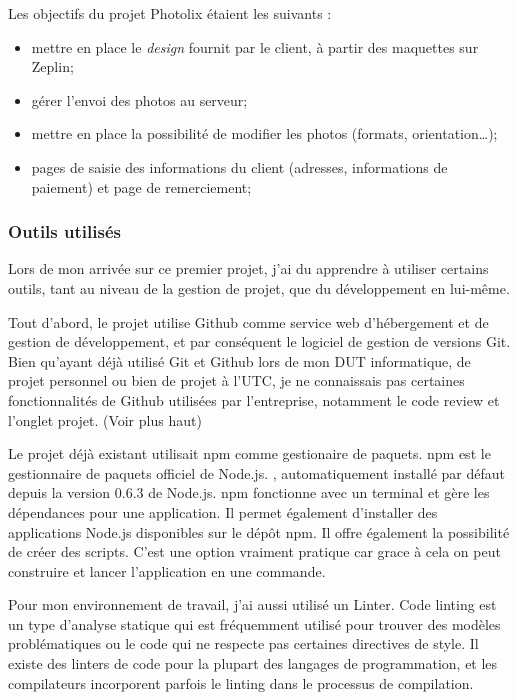 \bigskip

Les objectifs du projet Photolix étaient les suivants :

\begin{itemize}
\tightlist
\item
  mettre en place le \emph{design} fournit par le client, à partir des
  maquettes sur Zeplin;
\item
  gérer l'envoi des photos au serveur;
\item
  mettre en place la possibilité de modifier les photos (formats,
  orientation\ldots{});
\item
  pages de saisie des informations du client (adresses, informations de
  paiement) et page de remerciement;
\end{itemize}

\bigskip

\subsubsection{Outils utilisés}\label{outils-utilisuxe9s}

\bigskip

Lors de mon arrivée sur ce premier projet, j'ai du apprendre à utiliser
certains outils, tant au niveau de la gestion de projet, que du
développement en lui-même.

\bigskip

Tout d'abord, le projet utilise Github comme service web d'hébergement
et de gestion de développement, et par conséquent le logiciel de gestion
de versions Git. Bien qu'ayant déjà utilisé Git et Github lors de mon
DUT informatique, de projet personnel ou bien de projet à l'UTC, je ne
connaissais pas certaines fonctionnalités de Github utilisées par
l'entreprise, notamment le code review et l'onglet projet. (Voir plus
haut)

\bigskip

Le projet déjà existant utilisait npm comme gestionaire de paquets. npm
est le gestionnaire de paquets officiel de Node.js. , automatiquement
installé par défaut depuis la version 0.6.3 de Node.js. npm fonctionne
avec un terminal et gère les dépendances pour une application. Il permet
également d'installer des applications Node.js disponibles sur le dépôt
npm. Il offre également la possibilité de créer des scripts. C'est une
option vraiment pratique car grace à cela on peut construire et lancer
l'application en une commande.

\bigskip

Pour mon environnement de travail, j'ai aussi utilisé un Linter. Code
linting est un type d'analyse statique qui est fréquemment utilisé pour
trouver des modèles problématiques ou le code qui ne respecte pas
certaines directives de style. Il existe des linters de code pour la
plupart des langages de programmation, et les compilateurs incorporent
parfois le linting dans le processus de compilation.

